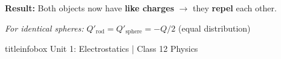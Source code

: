 \begin{frame}
\begin{formulabox}
\vspace{0.2cm}

\textbf{Result:} Both objects now have \textbf{like charges} $\rightarrow$ they \textbf{\textcolor{importantRed}{repel}} each other.

\vspace{0.1cm}

\textit{For identical spheres:} $Q'_{\text{rod}} = Q'_{\text{sphere}} = -Q/2$ (equal distribution)
\vspace{0.1cm}
\end{formulabox}

\vfill

\begin{beamercolorbox}[wd=\textwidth,ht=0.5cm,dp=0.1cm,center]{titleinfobox}
    \small\color{coolgray} Unit 1: Electrostatics | Class 12 Physics
\end{beamercolorbox}
\end{frame}

